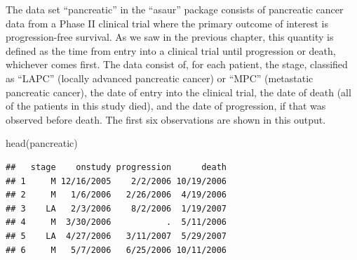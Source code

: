 \documentclass[
]{book}
\newenvironment{Shaded}{\begin{snugshade}}{\end{snugshade}}
\newcommand{\FunctionTok}[1]{\textcolor[rgb]{0.00,0.00,0.00}{#1}}
\newcommand{\NormalTok}[1]{#1}
\theoremstyle{definition}
\theoremstyle{definition}
\theoremstyle{definition}
\theoremstyle{definition}
\theoremstyle{remark}
\begin{document}
The data set ``pancreatic'' in the ``asaur'' package consists of pancreatic cancer data from a Phase II clinical trial where the primary outcome of interest is
progression-free survival. As we saw in the previous chapter, this quantity is defined
as the time from entry into a clinical trial until progression or death, whichever
comes first. The data consist of, for each patient, the stage, classified as ``LAPC''
(locally advanced pancreatic cancer) or ``MPC'' (metastatic pancreatic cancer), the
date of entry into the clinical trial, the date of death (all of the patients in this study
died), and the date of progression, if that was observed before death. The first six
observations are shown in this output.

\begin{Shaded}
\begin{Highlighting}[]
\FunctionTok{head}\NormalTok{(pancreatic)}
\end{Highlighting}
\end{Shaded}

\begin{verbatim}
##   stage    onstudy progression      death
## 1     M 12/16/2005    2/2/2006 10/19/2006
## 2     M   1/6/2006   2/26/2006  4/19/2006
## 3    LA   2/3/2006    8/2/2006  1/19/2007
## 4     M  3/30/2006           .  5/11/2006
## 5    LA  4/27/2006   3/11/2007  5/29/2007
## 6     M   5/7/2006   6/25/2006 10/11/2006
\end{verbatim}
\end{document}
